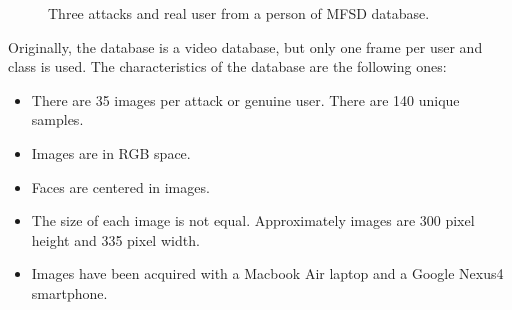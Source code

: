 \begin{figure}[htb]
\centering
{}

\caption{Three attacks and  real user from a person of MFSD database.} \label{fig:mfsd}
\end{figure}

Originally, the database is a video database, but only one frame per user and class is used. The characteristics of the database are the following ones:
\begin{itemize}[itemsep=2pt,topsep=8pt,parsep=0pt,partopsep=20pt]
\item There are 35 images per attack or genuine user. There are 140 unique samples.
\item Images are in RGB space.
\item Faces are centered in images.
\item The size of each image is not equal. Approximately images are 300 pixel height and 335 pixel width.
\item Images have been acquired with a Macbook Air laptop and a Google Nexus4 smartphone.
\end{itemize}

